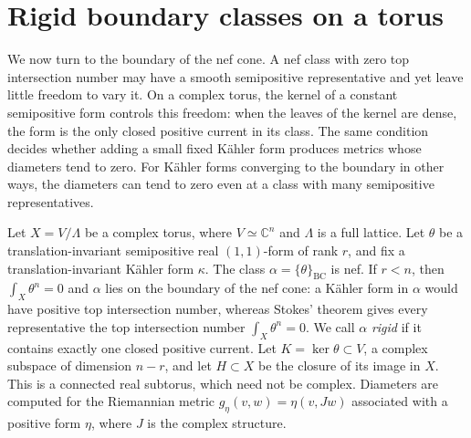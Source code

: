 \section{Rigid boundary classes on a torus}
\label{sec:torus-boundary-rigidity}

We now turn to the boundary of the nef cone. A nef class with zero top intersection number may have a smooth semipositive representative and yet leave little freedom to vary it. On a complex torus, the kernel of a constant semipositive form controls this freedom: when the leaves of the kernel are dense, the form is the only closed positive current in its class. The same condition decides whether adding a small fixed K\"ahler form produces metrics whose diameters tend to zero. For K\"ahler forms converging to the boundary in other ways, the diameters can tend to zero even at a class with many semipositive representatives.

Let $X=V/\Lambda$ be a complex torus, where $V\simeq\mathbb C^n$ and $\Lambda$ is a full lattice. Let $\theta$ be a translation-invariant semipositive real $(1,1)$-form of rank $r$, and fix a translation-invariant K\"ahler form $\kappa$. The class $\alpha=\{\theta\}_{\mathrm{BC}}$ is nef. If $r<n$, then $\int_X\theta^n=0$ and $\alpha$ lies on the boundary of the nef cone: a K\"ahler form in $\alpha$ would have positive top intersection number, whereas Stokes' theorem gives every representative the top intersection number $\int_X\theta^n=0$. We call $\alpha$ \emph{rigid} if it contains exactly one closed positive current. Let $K=\ker\theta\subset V$, a complex subspace of dimension $n-r$, and let $H\subset X$ be the closure of its image in $X$. This is a connected real subtorus, which need not be complex. Diameters are computed for the Riemannian metric $g_\eta(v,w)=\eta(v,Jw)$ associated with a positive form $\eta$, where $J$ is the complex structure.

